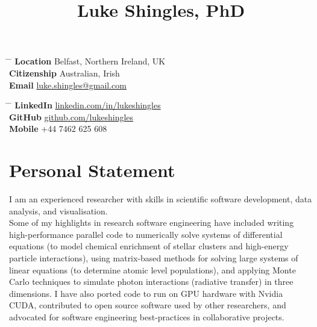 \documentclass[11pt]{article} %
\begin{document}

\title{Luke Shingles, PhD} %


\parbox{0.5\textwidth}{ %
\begin{tabbing} %
\hspace{2.3cm} \= \hspace{4cm} \= \kill %
{\bf Location} \> Belfast, Northern Ireland, UK\\
{\bf Citizenship} \> Australian, Irish\\
{\bf Email} \> \href{mailto:luke.shingles@gmail.com}{luke.shingles@gmail.com}
\end{tabbing}}
\hfill %
\parbox{0.5\textwidth}{ %
\begin{tabbing} %
\hspace{2.3cm} \= \hspace{4cm} \= \kill %
{\bf LinkedIn} \> \href{https://www.linkedin.com/in/lukeshingles}{linkedin.com/in/lukeshingles}\\
{\bf GitHub} \> \href{https://github.com/lukeshingles}{github.com/lukeshingles}\\
{\bf Mobile} \> +44 7462 625 608‬
\end{tabbing}}

\section{Personal Statement}
I am an experienced researcher with skills in scientific software development, data analysis, and visualisation.\\

Some of my highlights in research software engineering have included writing high-performance parallel code to numerically solve systems of differential equations (to model chemical enrichment of stellar clusters and high-energy particle interactions), using matrix-based methods for solving large systems of linear equations (to determine atomic level populations), and applying Monte Carlo techniques to simulate photon interactions (radiative transfer) in three dimensions. I have also ported code to run on GPU hardware with Nvidia CUDA, contributed to open source software used by other researchers, and advocated for software engineering best-practices in collaborative projects.\\
\end{document}
